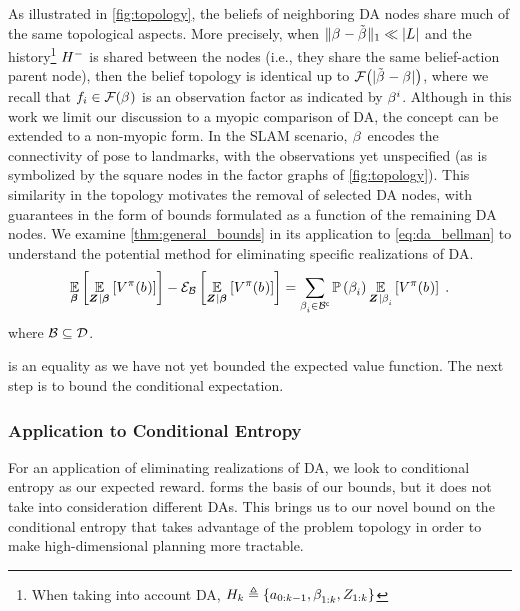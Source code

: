 As illustrated in \cref{fig:topology}, the beliefs of neighboring DA nodes share much of the same topological aspects. More precisely, when $\lVert\beta_{}^{}-\tilde{\beta_{}^{}}\rVert_{1}\ll\lvert L\rvert$ and the history\footnote{When taking into account DA, $H_{k}\triangleq\{{a_{0:k-1}},\beta_{1:k}^{},Z_{1:k}\}$} $H_{}^-$ is shared between the nodes (i.e., they share the same belief-action parent node), then the belief topology is identical up to
$\mathcal{F}\bigl(\lvert\tilde{\beta_{}^{}}-\beta_{}^{}\rvert\bigr)$, where we recall that $f_i\in\mathcal{F}(\beta_{}^{})$ is an observation factor as indicated by $\beta_{}^{i}$. Although in this work we limit our discussion to a myopic comparison of DA, the concept can be extended to a non-myopic form. In the SLAM scenario, $\beta_{}^{}$ encodes the connectivity of pose to landmarks, with the observations yet unspecified (as is symbolized by the square nodes in the factor graphs of \cref{fig:topology}). This similarity in the topology motivates the removal of selected DA nodes, with guarantees in the form of bounds formulated as a function of the remaining DA nodes. We examine \cref{thm:general_bounds} in its application to \eqref{eq:da_bellman} to understand the potential method for eliminating specific realizations of DA.
\begin{equation}
	\label{eq:remove_da}
	\expectation{\expectation{V^\pi(\blf{})}{\observationsRV{}\mid\daRV{}{}}}{\daRV{}{}}-\partialexpectation{\expectation{V^\pi(\blf{})}{\observationsRV{}\mid\daRV{}{}}}{\subSpace}=\sum_{\da{i}{}\in\stcomp{\subSpace}}\measure{\da{i}{}}\expectation{V^\pi(\blf{})}{\observationsRV{}\mid\da{i}{}}\;.
\end{equation}
where $\mathcal B\subseteq\mathcal{D}$.

 is an equality as we have not yet bounded the expected value function. The next step is to bound the conditional expectation.

\subsubsection{Application to Conditional Entropy}

For an application of eliminating realizations of DA, we look to conditional entropy as our expected reward.  forms the basis of our bounds, but it does not take into consideration different DAs. This brings us to our novel bound on the conditional entropy that takes advantage of the problem topology in order to make high-dimensional planning more tractable.

